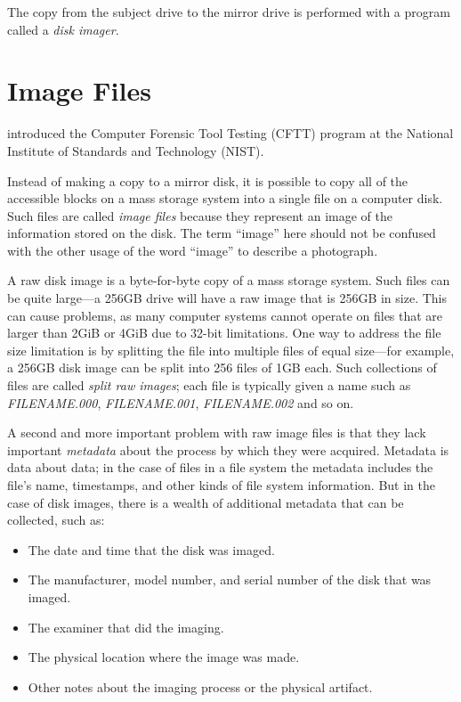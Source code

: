 \documentclass[11pt,letter]{article}
\newcommand{\citeN}[1]{\cite{#1}}
\begin{document}
The copy from the subject drive to the mirror drive is performed with
a program called a \emph{disk imager}.

\section{Image Files}

\citeN{dfrws2002:JamesLyle} introduced the Computer Forensic Tool Testing (CFTT)
program at the National Institute of Standards and Technology (NIST).



Instead of making a copy to a mirror disk, it is possible to copy all
of the accessible blocks on a mass storage system into a single file
on a computer disk. Such files are called \emph{image files} because
they represent an image of the information stored on the disk. The
term ``image'' here should not be confused with the other usage of the
word ``image'' to describe a photograph.

A raw disk image is a byte-for-byte copy of a mass storage
system. Such files can be quite large---a 256GB drive will have a raw
image that is 256GB in size. This can cause problems, as many computer
systems cannot operate on files that are larger than 2GiB or 4GiB due
to 32-bit limitations. One way to address the file size limitation is
by splitting the file into multiple files of equal size---for example,
a 256GB disk image can be split into 256 files of 1GB each. Such
collections of files are called \emph{split raw images}; each file is
typically given a name such as \emph{FILENAME.000}, \emph{FILENAME.001},
\emph{FILENAME.002} and so on.

A second and more important problem with raw image files is that they
lack important \emph{metadata} about the process by which they were
acquired. Metadata is data about data; in the case of files in a file
system the metadata includes the file's name, timestamps, and other
kinds of file system information. But in the case of disk images,
there is a wealth of additional metadata that can be collected, such
as:

\begin{itemize}
\item The date and time that the disk was imaged.
\item The manufacturer, model number, and serial number of the disk
  that was imaged.
\item The examiner that did the imaging.
\item The physical location where the image was made.
\item Other notes about the imaging process or the physical artifact.
\end{itemize}
\end{document}
